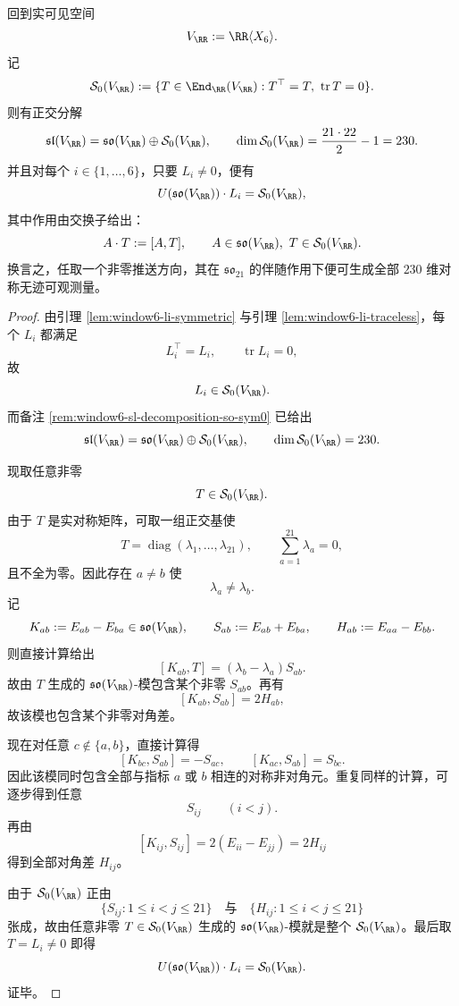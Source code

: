 \begin{theorem}\label{thm:xi-time-part9zn-window6-so21-orbit-saturation-sym0}
回到实可见空间
\[
V_{\RR}:=\RR\langle X_6\rangle.
\]
记
\[
\mathcal S_0(V_{\RR})
:=
\{T\in \End_{\RR}(V_{\RR}):T^\top=T,\ \operatorname{tr}T=0\}.
\]
则有正交分解
\[
\mathfrak{sl}(V_{\RR})
=
\mathfrak{so}(V_{\RR})\oplus \mathcal S_0(V_{\RR}),
\qquad
\dim \mathcal S_0(V_{\RR})=\frac{21\cdot 22}{2}-1=230.
\]
并且对每个 \(i\in\{1,\dots,6\}\)，只要 \(L_i\neq 0\)，便有
\[
U(\mathfrak{so}(V_{\RR}))\cdot L_i=\mathcal S_0(V_{\RR}),
\]
其中作用由交换子给出：
\[
A\cdot T:=[A,T],
\qquad
A\in \mathfrak{so}(V_{\RR}),\ T\in \mathcal S_0(V_{\RR}).
\]
换言之，任取一个非零推送方向，其在 \(\mathfrak{so}_{21}\) 的伴随作用下便可生成全部 \(230\) 维对称无迹可观测量。
\end{theorem}
\begin{proof}
由引理 \ref{lem:window6-li-symmetric} 与引理 \ref{lem:window6-li-traceless}，每个 \(L_i\) 都满足
\[
L_i^\top=L_i,
\qquad
\operatorname{tr}L_i=0,
\]
故
\[
L_i\in \mathcal S_0(V_{\RR}).
\]
而备注 \ref{rem:window6-sl-decomposition-so-sym0} 已给出
\[
\mathfrak{sl}(V_{\RR})
=
\mathfrak{so}(V_{\RR})\oplus \mathcal S_0(V_{\RR}),
\qquad
\dim \mathcal S_0(V_{\RR})=230.
\]

现取任意非零
\[
T\in \mathcal S_0(V_{\RR}).
\]
由于 \(T\) 是实对称矩阵，可取一组正交基使
\[
T=\operatorname{diag}(\lambda_1,\dots,\lambda_{21}),
\qquad
\sum_{a=1}^{21}\lambda_a=0,
\]
且不全为零。因此存在 \(a\neq b\) 使
\[
\lambda_a\neq \lambda_b.
\]
记
\[
K_{ab}:=E_{ab}-E_{ba}\in\mathfrak{so}(V_{\RR}),
\qquad
S_{ab}:=E_{ab}+E_{ba},
\qquad
H_{ab}:=E_{aa}-E_{bb}.
\]
则直接计算给出
\[
[K_{ab},T]=(\lambda_b-\lambda_a)S_{ab}.
\]
故由 \(T\) 生成的 \(\mathfrak{so}(V_{\RR})\)-模包含某个非零 \(S_{ab}\)。再有
\[
[K_{ab},S_{ab}]=2H_{ab},
\]
故该模也包含某个非零对角差。

现在对任意 \(c\notin\{a,b\}\)，直接计算得
\[
[K_{bc},S_{ab}]=-S_{ac},
\qquad
[K_{ac},S_{ab}]=S_{bc}.
\]
因此该模同时包含全部与指标 \(a\) 或 \(b\) 相连的对称非对角元。重复同样的计算，可逐步得到任意
\[
S_{ij}\qquad (i<j).
\]
再由
\[
[K_{ij},S_{ij}]=2(E_{ii}-E_{jj})=2H_{ij}
\]
得到全部对角差 \(H_{ij}\)。

由于 \(\mathcal S_0(V_{\RR})\) 正由
\[
\{S_{ij}:1\le i<j\le 21\}
\quad\text{与}\quad
\{H_{ij}:1\le i<j\le 21\}
\]
张成，故由任意非零 \(T\in \mathcal S_0(V_{\RR})\) 生成的 \(\mathfrak{so}(V_{\RR})\)-模就是整个 \(\mathcal S_0(V_{\RR})\)。最后取 \(T=L_i\neq 0\) 即得
\[
U(\mathfrak{so}(V_{\RR}))\cdot L_i=\mathcal S_0(V_{\RR}).
\]
证毕。
\end{proof}

